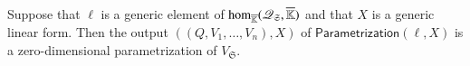 \documentclass[final,1p,times,authoryear]{elsarticle}
\newcommand{\minpoly}{P}
\newcommand{\lf}{X}
\newcommand{\residueI}{\mathscr{Q}}
\newcommand{\sqfree}{Q}
\def\Kbar {{\ensuremath{\overline{\mathbb{K}}}}}
\begin{document}
\begin{lemma}\label{lemma:para2}
  Suppose that $\ell$ is a generic element of ${\rm
  hom}_{\Kbar}(\residueI_\mathfrak{S},\Kbar)$ and that $\lf$ is a generic
  linear form. Then the output $((\sqfree,V_1,\dots,V_n),\lf)$ of
  $\mathsf{Parametrization}(\ell,\lf)$ is a zero-dimensional
  parametrization of $V_{\mathfrak{S}}$.
\end{lemma}


\end{document}

